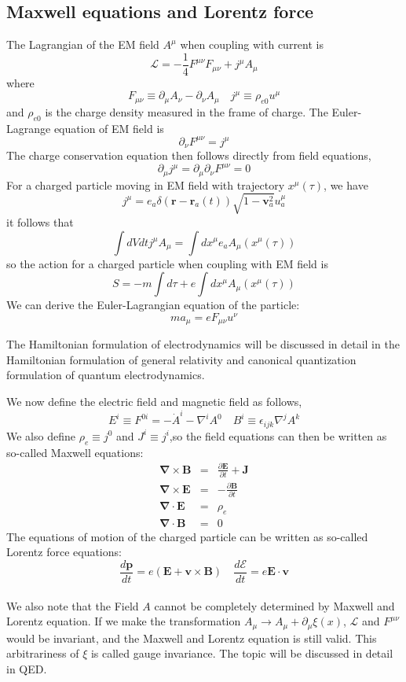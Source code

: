 \subsection{Maxwell equations and Lorentz force}
The Lagrangian of the EM field $A^{\mu}$ when coupling with current is
\[\mathcal{L} = -\frac{1}{4}F^{\mu\nu}F_{\mu\nu} + j^{\mu} A_{\mu}\]
where
\[F_{\mu\nu} \equiv \partial_{\mu}A_{\nu} - \partial_{\nu}A_{\mu} \quad j^{\mu} \equiv \rho_{e0} u^{\mu}\]
and $\rho_{e0}$ is the charge density measured in the frame of charge.
The Euler-Lagrange equation of EM field is
\[\partial_{\nu} F^{\mu\nu} = j^{\mu}\]
The charge conservation equation then follows directly from field equations,
\[\partial_{\mu} j^{\mu} = \partial_{\mu} \partial_{\nu} F^{\mu\nu} = 0\]
For a charged particle moving in EM field with trajectory $x^{\mu}(\tau)$, we have
\[j^{\mu} =  e_a \delta(\bm{r}-\bm{r}_a(t)) \sqrt{1-\bm{v}_a^2} u_a^\mu \]
it follows that
\[\int dV dt j^{\mu} A_{\mu} = \int dx^{\mu} e_a A_{\mu}(x^{\mu}(\tau))\]
so the action for a charged particle when coupling with EM field is
\[S = - m \int d\tau + e\int dx^{\mu} A_{\mu}(x^{\mu}(\tau))\]
We can derive the Euler-Lagrangian equation of the particle:
\[ma_{\mu} = eF_{\mu \nu}u^{\nu}\]
\begin{note}
The Hamiltonian formulation of electrodynamics will be discussed in detail in the Hamiltonian formulation of general relativity and canonical quantization formulation of quantum electrodynamics.
\end{note}
\noindent
We now define the electric field and magnetic field as follows,
\[E^i \equiv F^{0i} = -\dot{A}^i - \nabla^i A^0 \quad B^i \equiv \epsilon_{ijk} \nabla^j A^k\]
We also define $\rho_e \equiv j^0$ and $J^i \equiv j^i$,so
the field equations can then be written as so-called Maxwell equations:
\begin{eqnarray}
	\bm{\nabla} \times  \bm{B} &=& \frac{\partial \bm{E}}{\partial t} +  \bm{J} \nonumber \\
	\bm{\nabla} \times \bm{E} &=& -\frac{\partial \bm{B}}{\partial t} \nonumber \\
	\bm{\nabla} \cdot \bm{E} &=& \rho_e \nonumber \\
	\bm{\nabla} \cdot \bm{B} &=& 0 \nonumber
\end{eqnarray}
The equations of motion of the charged particle can be written as so-called Lorentz force equations:
\[\frac{d\bm{p}}{dt} = e(\bm{E} + \bm{v} \times \bm{B}) \quad \frac{d \mathcal{E}}{dt} = e \bm{E} \cdot \bm{v}\]
\\
We also note that the Field $A$ cannot be completely determined by Maxwell and Lorentz equation. If we make the transformation $A_{\mu} \to A_{\mu} + \partial_{\mu} \xi(x)$, $\mathcal{L}$ and $F^{\mu\nu}$ would be invariant, and the Maxwell and Lorentz equation is still valid. This arbitrariness of $\xi$ is called gauge invariance. The topic will be discussed in detail in QED.

